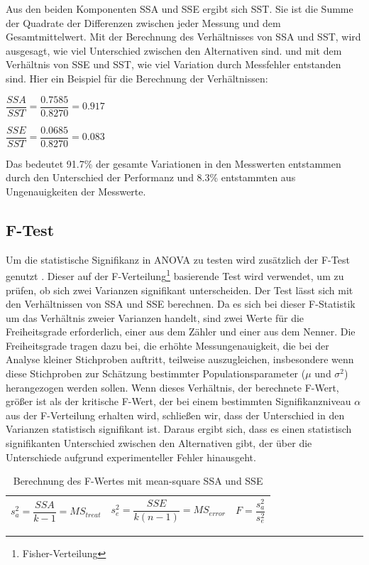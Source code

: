 Aus den beiden Komponenten SSA und SSE ergibt sich SST.
Sie ist die Summe der Quadrate der Differenzen zwischen jeder Messung und dem Gesamtmittelwert.
Mit der Berechnung des Verhältnisses von SSA und SST, wird ausgesagt, wie viel Unterschied zwischen den Alternativen sind.
und mit dem Verhältnis von SSE und SST, wie viel Variation durch Messfehler entstanden sind.  
Hier ein Beispiel für die Berechnung der Verhältnissen:

\begin{center}
  $\dfrac{SSA}{SST} = \dfrac{0.7585}{0.8270} = 0.917$
\end{center}

\begin{center}
  $\dfrac{SSE}{SST} = \dfrac{0.0685}{0.8270} = 0.083$
\end{center}

Das bedeutet 91.7\% der gesamte Variationen in den Messwerten entstammen durch den Unterschied der Performanz und
8.3\% entstammten aus Ungenauigkeiten der Messwerte. 

\subsection{F-Test}
Um die statistische Signifikanz in ANOVA zu testen wird zusätzlich der F-Test genutzt \cite[S. 71 ff.]{Lilja_2000}.
Dieser auf der F-Verteilung\footnote{Fisher-Verteilung} basierende Test wird verwendet, um zu prüfen, ob sich zwei Varianzen signifikant unterscheiden.
Der Test lässt sich mit den Verhältnissen von SSA und SSE berechnen.
Da es sich bei dieser F-Statistik um das Verhältnis zweier Varianzen handelt, sind zwei Werte für die Freiheitsgrade erforderlich, 
einer aus dem Zähler und einer aus dem Nenner.
Die Freiheitsgrade tragen dazu bei, die erhöhte Messungenauigkeit, die bei der Analyse kleiner Stichproben auftritt, 
teilweise auszugleichen, insbesondere wenn diese Stichproben zur Schätzung bestimmter Populationsparameter ($\mu$ und $\sigma^2$) herangezogen werden sollen. \cite[S. 49]{inferenzstatistik}
Wenn dieses Verhältnis, der berechnete F-Wert, größer ist als der kritische F-Wert, der bei einem bestimmten Signifikanzniveau $\alpha$ aus der F-Verteilung erhalten wird, 
schließen wir, dass der Unterschied in den Varianzen statistisch signifikant ist. Daraus ergibt sich, 
dass es einen statistisch signifikanten Unterschied zwischen den Alternativen gibt, der über die Unterschiede aufgrund experimenteller Fehler hinausgeht.

\begin{center}
  \begin{table}[h!]
    \begin{tabularx}{\textwidth}{|X|X|X|}
      \hline
       $s^2_a = \dfrac{SSA}{k - 1} = MS_{treat}$ & $s^2_e = \dfrac{SSE}{k(n-1)} = MS_{error}$ & $F = \dfrac{s^2_a}{s^2_e}$\\ 
      \hline
    \end{tabularx}
    \caption{Berechnung des F-Wertes mit mean-square SSA und SSE}
    \label{tab:f_computing}
  \end{table}
\end{center}

